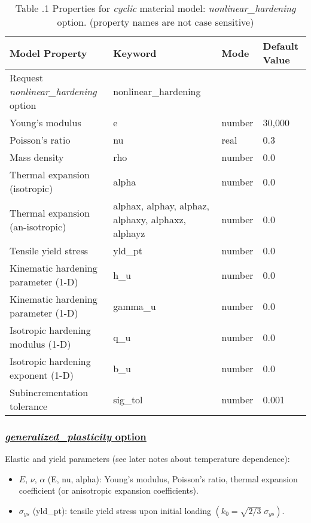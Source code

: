 \documentclass[11pt]{report}
\numberwithin{equation}{section}
\newcommand{\bsf } [1]{\textrm{\textit{#1}}\xspace}
\begin{document}
\begin{table}[htb]	
\small
	\centering
		\begin{tabular}{ |p{2.5in} | p{1.5in} | p{0.8in} |p{0.7in} | }
		\hline
		Model Property & Keyword & Mode & Default Value \\
		\hline \hline
Request \textit{nonlinear\_hardening} option &nonlinear\_hardening &\  &\  \\ \hline
Young's modulus	& e	& number	& 30,000 \\ \hline
Poisson's ratio	& nu	 & real	& 0.3 \\ \hline
Mass density	& rho & 	number	& 0.0 \\ \hline
Thermal expansion (isotropic)	& alpha & 	number	& 0.0 \\ \hline
Thermal expansion (an-isotropic) & alphax, alphay, alphaz, alphaxy, alphaxz, alphayz & number & 0.0 \\ \hline
Tensile yield stress	& yld\_pt	& number	& 0.0 \\ \hline
Kinematic hardening parameter (1-D)	& h\_u	& number	& 0.0 \\ \hline
Kinematic hardening parameter (1-D)	& gamma\_u	 & number	& 0.0 \\ \hline
Isotropic hardening modulus (1-D) & 	q\_u & 	number	& 0.0 \\ \hline
Isotropic hardening exponent (1-D) & 	b\_u	 & number	& 0.0 \\ \hline
Subincrementation tolerance	& sig\_tol & 	number &	0.001 \\ \hline
		\end{tabular}
  \caption{\small Table \thesection.1 
Properties for \textit{cyclic} material model: \textit{nonlinear\_hardening} option. (property names are 
not case sensitive)
\normalsize}
	\label{table:nonlinear_hardening}
\end{table}


\subsubsection{\underline{\bsf{generalized\_plasticity} option}}

\noindent Elastic and yield parameters (see later notes about temperature dependence):
\begin {itemize}
\item $E$, $\nu$, $\alpha$ (E, nu, alpha): Young's modulus, Poisson's ratio, thermal expansion coefficient
(or anisotropic expansion coefficients).
\item $\sigma_{ys}$ (yld\_pt): tensile yield stress upon initial loading 
$( k_0= \sqrt{2/3} \; \sigma_{ys})$.
\end{itemize}
\end{document}
